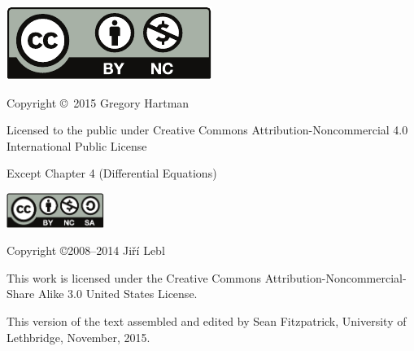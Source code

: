 \noindent\hskip -1in\begin{minipage}{2in}
\includegraphics{text/by-nc} 
\end{minipage}
\begin{minipage}{3in}
\noindent Copyright \copyright\ 2015 Gregory Hartman

Licensed to the public under Creative Commons Attribution-Noncommercial 4.0 International Public License
\end{minipage}

\bigskip

\bigskip

Except Chapter 4 (Differential Equations) 

\bigskip

\bigskip

\noindent\hskip -1in\begin{minipage}{2in}
\includegraphics[width=1.25in]{figures/license} 
\end{minipage}
\begin{minipage}{3in}
\noindent Copyright \copyright 2008--2014 Ji{\v r}\'i Lebl

This work is licensed under the Creative Commons
Attribution-Non\-commercial-Share Alike 3.0 United States License. 
\end{minipage}

\bigskip

\bigskip

This version of the text assembled and edited by Sean Fitzpatrick, University of Lethbridge, November, 2015. 
